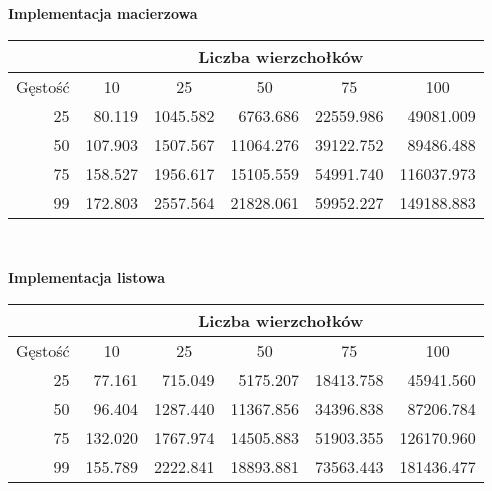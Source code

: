 \documentclass[12pt]{article}
\begin{document}
\textbf{Implementacja macierzowa}\\
\begin{center}
\begin{tabular}{|r|r|r|r|r|r|}
\hline
\multicolumn{1}{|c|}{}        & \multicolumn{5}{c|}{Liczba wierzchołków}                                                                                         \\ \hline
\multicolumn{1}{|c|}{Gęstość} & \multicolumn{1}{c|}{10} & \multicolumn{1}{c|}{25} & \multicolumn{1}{c|}{50} & \multicolumn{1}{c|}{75} & \multicolumn{1}{c|}{100} \\ \hline
25                  & 80.119  & 1045.582 & 6763.686  & 22559.986 & 49081.009  \\ \hline
50                  & 107.903 & 1507.567 & 11064.276 & 39122.752 & 89486.488  \\ \hline
75                  & 158.527 & 1956.617 & 15105.559 & 54991.740 & 116037.973 \\ \hline
99                  & 172.803 & 2557.564 & 21828.061 & 59952.227 & 149188.883 \\ \hline
\end{tabular}
\end{center}
\\
\vspace{10mm}

\textbf{Implementacja listowa}\\

\begin{center}
\begin{tabular}{|r|r|r|r|r|r|}
\hline
\multicolumn{1}{|c|}{}        & \multicolumn{5}{c|}{Liczba wierzchołków}                                                                                         \\ \hline
\multicolumn{1}{|c|}{Gęstość} & \multicolumn{1}{c|}{10} & \multicolumn{1}{c|}{25} & \multicolumn{1}{c|}{50} & \multicolumn{1}{c|}{75} & \multicolumn{1}{c|}{100} \\ \hline
25                  & 77.161  & 715.049  & 5175.207  & 18413.758 & 45941.560  \\ \hline
50                  & 96.404  & 1287.440 & 11367.856 & 34396.838 & 87206.784  \\ \hline
75                  & 132.020 & 1767.974 & 14505.883 & 51903.355 & 126170.960 \\ \hline
99                  & 155.789 & 2222.841 & 18893.881 & 73563.443 & 181436.477 \\ \hline
\end{tabular}
\end{center}
\end{document}
